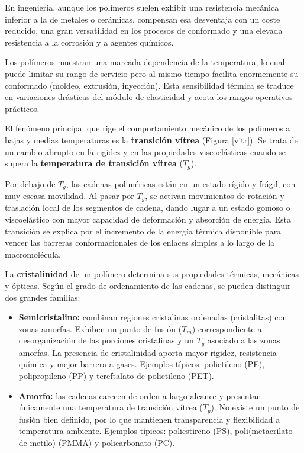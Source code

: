 En ingeniería, aunque los polímeros suelen exhibir una resistencia mecánica inferior a la de metales o cerámicas, compensan esa desventaja con un coste reducido, una gran versatilidad en los procesos de conformado y una elevada resistencia a la corrosión y a agentes químicos.

Los polímeros muestran una marcada dependencia de la temperatura, lo cual puede limitar su rango de servicio pero al mismo tiempo facilita enormemente su conformado (moldeo, extrusión, inyección). Esta sensibilidad térmica se traduce en variaciones drásticas del módulo de elasticidad y acota los rangos operativos prácticos. 

El fenómeno principal que rige el comportamiento mecánico de los polímeros a bajas y medias temperaturas es la \textbf{transición vítrea} (Figura \ref{vitr}). Se trata de un cambio abrupto en la rigidez y en las propiedades viscoelásticas cuando se supera la \textbf{temperatura de transición vítrea} (\(T_{g}\)). 

Por debajo de \(T_{g}\), las cadenas poliméricas están  en un estado rígido y frágil, con muy escasa movilidad. Al pasar por \(T_{g}\), se activan movimientos de rotación y traslación local de los segmentos de cadena, dando lugar a un estado gomoso o viscoelástico con mayor capacidad de deformación y absorción de energía. Esta transición se explica por el incremento de la energía térmica disponible para vencer las barreras conformacionales de los enlaces simples a lo largo de la macromolécula.

La \textbf{cristalinidad} de un polímero determina sus propiedades térmicas, mecánicas y ópticas. Según el grado de ordenamiento de las cadenas, se pueden distinguir dos grandes familias:

\begin{itemize}
  \item \textbf{Semicristalino:} combinan regiones cristalinas ordenadas (cristalitas) con zonas amorfas. Exhiben un punto de fusión (\(T_m\)) correspondiente a desorganización de las porciones cristalinas y un \(T_g\) asociado a las zonas amorfas. La presencia de cristalinidad aporta mayor rigidez, resistencia química y mejor barrera a gases. Ejemplos típicos: polietileno (PE), polipropileno (PP) y tereftalato de polietileno (PET).
  \item \textbf{Amorfo:} las cadenas carecen de orden a largo alcance y presentan únicamente una temperatura de transición vítrea (\(T_g\)). No existe un punto de fusión bien definido, por lo que mantienen transparencia y flexibilidad a temperatura ambiente. Ejemplos típicos: poliestireno (PS), poli(metacrilato de metilo) (PMMA) y policarbonato (PC).
\end{itemize}


